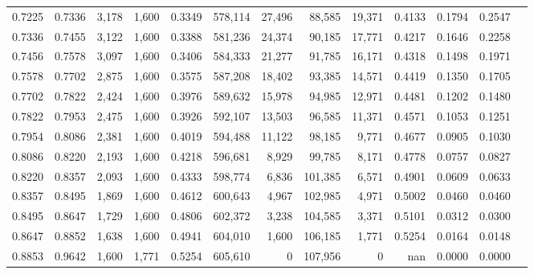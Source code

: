 \begin{tabular}{rrrrrrrrrrrrr}
0.7225 & 0.7336 &  3,178 & 1,600 &                                     0.3349 & 578,114 &  27,496 &  88,585 &  19,371 & 0.4133 & 0.1794 & 0.2547 \\
0.7336 & 0.7455 &  3,122 & 1,600 &                                     0.3388 & 581,236 &  24,374 &  90,185 &  17,771 & 0.4217 & 0.1646 & 0.2258 \\
0.7456 & 0.7578 &  3,097 & 1,600 &                                     0.3406 & 584,333 &  21,277 &  91,785 &  16,171 & 0.4318 & 0.1498 & 0.1971 \\
0.7578 & 0.7702 &  2,875 & 1,600 &                                     0.3575 & 587,208 &  18,402 &  93,385 &  14,571 & 0.4419 & 0.1350 & 0.1705 \\
0.7702 & 0.7822 &  2,424 & 1,600 &                                     0.3976 & 589,632 &  15,978 &  94,985 &  12,971 & 0.4481 & 0.1202 & 0.1480 \\
0.7822 & 0.7953 &  2,475 & 1,600 &                                     0.3926 & 592,107 &  13,503 &  96,585 &  11,371 & 0.4571 & 0.1053 & 0.1251 \\
0.7954 & 0.8086 &  2,381 & 1,600 &                                     0.4019 & 594,488 &  11,122 &  98,185 &   9,771 & 0.4677 & 0.0905 & 0.1030 \\
0.8086 & 0.8220 &  2,193 & 1,600 &                                     0.4218 & 596,681 &   8,929 &  99,785 &   8,171 & 0.4778 & 0.0757 & 0.0827 \\
0.8220 & 0.8357 &  2,093 & 1,600 &                                     0.4333 & 598,774 &   6,836 & 101,385 &   6,571 & 0.4901 & 0.0609 & 0.0633 \\
0.8357 & 0.8495 &  1,869 & 1,600 &                                     0.4612 & 600,643 &   4,967 & 102,985 &   4,971 & 0.5002 & 0.0460 & 0.0460 \\
0.8495 & 0.8647 &  1,729 & 1,600 &                                     0.4806 & 602,372 &   3,238 & 104,585 &   3,371 & 0.5101 & 0.0312 & 0.0300 \\
0.8647 & 0.8852 &  1,638 & 1,600 &                                     0.4941 & 604,010 &   1,600 & 106,185 &   1,771 & 0.5254 & 0.0164 & 0.0148 \\
0.8853 & 0.9642 &  1,600 & 1,771 &                                     0.5254 & 605,610 &       0 & 107,956 &       0 &    nan & 0.0000 & 0.0000 \\
\bottomrule
\end{tabular}
